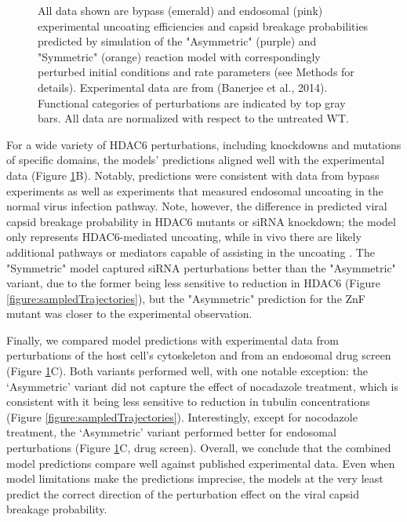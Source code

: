 \begin{figure}
\begin{center}
{All data shown are bypass (emerald) and endosomal (pink) experimental uncoating efficiencies and capsid breakage probabilities predicted by simulation of the "Asymmetric" (purple) and "Symmetric" (orange) reaction model with correspondingly perturbed initial conditions and rate parameters (see Methods for details). Experimental data are from (Banerjee et al., 2014). Functional categories of perturbations are indicated by top gray bars. All data are normalized with respect to the untreated WT.
}
\label{figure:reactionModelPredictions}
\end{center}
\end{figure}

For a wide variety of HDAC6 perturbations, including knockdowns and mutations of specific domains, the models’ predictions aligned well with the experimental data (Figure \ref{figure:reactionModelPredictions}B). Notably, predictions were consistent with data from bypass experiments as well as experiments that measured endosomal uncoating in the normal virus infection pathway. Note, however, the difference in predicted viral capsid breakage probability in HDAC6 mutants or siRNA knockdown; the model only represents HDAC6-mediated uncoating, while in vivo there are likely additional pathways or mediators capable of assisting in the uncoating \cite{gschweitl2016spopl,huotari2012cullin,miyake2019influenza,su2013pooled,yanguez2018phosphoproteomic}. The "Symmetric" model captured siRNA perturbations better than the "Asymmetric" variant, due to the former being less sensitive to reduction in HDAC6 (Figure \ref{figure:sampledTrajectories}), but the "Asymmetric" prediction for the ZnF mutant was closer to the experimental observation.

Finally, we compared model predictions with experimental data from perturbations of the host cell’s cytoskeleton and from an endosomal drug screen \cite{banerjee2014influenza} (Figure \ref{figure:reactionModelPredictions}C). Both variants performed well, with one notable exception: the ‘Asymmetric’ variant did not capture the effect of nocadazole treatment, which is consistent with it being less sensitive to reduction in tubulin concentrations (Figure \ref{figure:sampledTrajectories}). Interestingly, except for nocodazole treatment, the ‘Asymmetric’ variant performed better for endosomal perturbations (Figure \ref{figure:reactionModelPredictions}C, drug screen). Overall, we conclude that the combined model predictions compare well against published experimental data. Even when model limitations make the predictions imprecise, the models at the very least predict the correct direction of the perturbation effect on the viral capsid breakage probability. 

